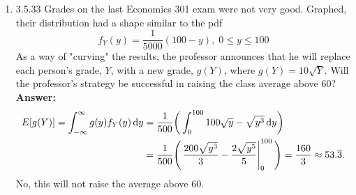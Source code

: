 \documentclass{article}
\begin{document}
\begin{enumerate}
        \item 3.5.33 Grades on the last Economics 301 exam were not very good. Graphed, their distribution had a shape similar to the pdf
            \[f_Y(y) = \frac{1}{5000}(100-y), \; 0 \leq y \leq 100\]
        As a way of "curving" the results, the professor announces that he will replace each person's grade, $Y$, with a new grade, $g(Y)$, where $g(Y) = 10\sqrt{Y}$. Will the professor's strategy be successful in raising the class average above $60$?\\
        \textbf{Answer: }
            \begin{align*}
                E[g(Y)] = \int_{-\infty}^\infty g(y)f_Y(y) \dif y &=  \frac{1}{500}\bigg(\int_0^{100} 100\sqrt{y} - \sqrt{y^3}\dif y\bigg)\\
                &= \frac{1}{500}\Bigg(\eval{\frac{200\sqrt{y^3}}{3} - \frac{2\sqrt{y^5}}{5}}_0^{100}\Bigg) = \frac{160}{3} \approx 53.\overline{3}.
            \end{align*}
        No, this will not raise the average above $60$.
    \end{enumerate}
\end{document}
